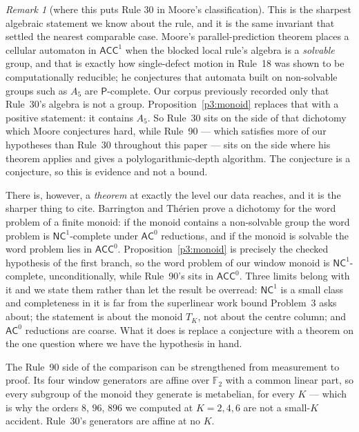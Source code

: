 \documentclass[11pt]{article}
\theoremstyle{definition}
\theoremstyle{remark}
\newtheorem{remark}[theorem]{Remark}
\newcommand{\F}{\mathbb{F}_2}
\begin{document}
\begin{remark}[where this puts Rule 30 in Moore's classification]\label{p3:moore}
This is the sharpest algebraic statement we know about the rule, and it is the same invariant that
settled the nearest comparable case. Moore's parallel-prediction theorem \cite{Moore98} places a cellular automaton in
$\mathsf{ACC}^1$ when the blocked local rule's algebra is a \emph{solvable} group, and that is exactly
how single-defect motion in Rule~18 was shown to be computationally reducible; he conjectures that
automata built on non-solvable groups such as $A_5$ are $\mathsf{P}$-complete. Our corpus previously
recorded only that Rule~30's algebra is not a group. Proposition~\ref{p3:monoid} replaces that with a
positive statement: it contains $A_5$. So Rule~30 sits on the side of that dichotomy which Moore
conjectures hard, while Rule~90 --- which satisfies more of our hypotheses than Rule~30 throughout this
paper --- sits on the side where his theorem applies and gives a polylogarithmic-depth algorithm. The
conjecture is a conjecture, so this is evidence and not a bound.

There is, however, a \emph{theorem} at exactly the level our data reaches, and it is the sharper thing
to cite. Barrington and Th\'erien \cite{BT} prove a dichotomy for the word problem of a finite monoid:
if the monoid contains a non-solvable group the word problem is $\mathsf{NC}^1$-complete under
$\mathsf{AC}^0$ reductions, and if the monoid is solvable the word problem lies in $\mathsf{ACC}^0$.
Proposition~\ref{p3:monoid} is precisely the checked hypothesis of the first branch, so the word
problem of our window monoid is $\mathsf{NC}^1$-complete, unconditionally, while Rule~90's sits in
$\mathsf{ACC}^0$. Three limits belong with it and we state them rather than let the result be
overread: $\mathsf{NC}^1$ is a small class and completeness in it is far from the superlinear work
bound Problem~3 asks about; the statement is about the monoid $T_K$, not about the centre column; and
$\mathsf{AC}^0$ reductions are coarse. What it does is replace a conjecture with a theorem on the one
question where we have the hypothesis in hand.

The Rule~90 side of the comparison can be strengthened from measurement to proof. Its four window
generators are affine over $\F$ with a common linear part, so every subgroup of the monoid they
generate is metabelian, for every $K$ --- which is why the orders $8$, $96$, $896$ we computed at
$K=2,4,6$ are not a small-$K$ accident. Rule~30's generators are affine at no $K$.
\end{remark}
\end{document}
